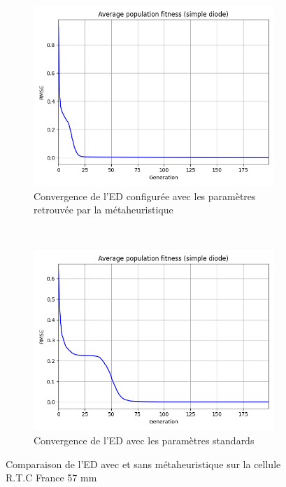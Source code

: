 \begin{figure}[!h]
    \centering
    \begin{subfigure}[b]{0.49\textwidth}
        \includegraphics[width=\textwidth]{resources/RTCFrance/metaconv.png}
        \caption{Convergence de l'ED configurée avec les paramètres retrouvée par la métaheuristique}
    \end{subfigure}
    ~
    \begin{subfigure}[b]{0.49\textwidth}
        \includegraphics[width=\textwidth]{resources/RTCFrance/stdconv.png}
        \caption{Convergence de l'ED avec les paramètres standards}
    \end{subfigure}
    \caption{Comparaison de l'ED avec et sans métaheuristique sur la cellule R.T.C France 57 mm}
    \label{fig:metaconv2}
\end{figure}%
